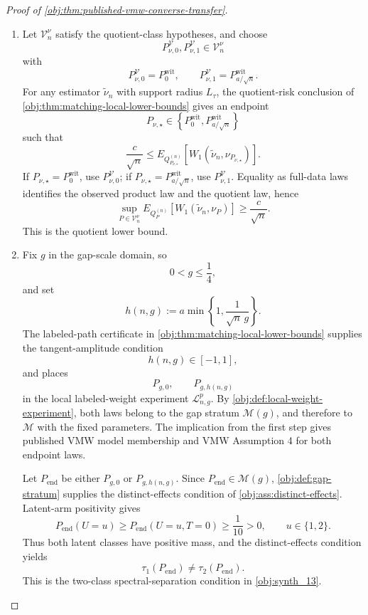 \documentclass[11pt]{article}
\begin{document}
\begin{proof}[Proof of \cref{obj:thm:published-vmw-converse-transfer}]
\begin{enumerate}
\item Let \(\mathcal V_n^\nu\) satisfy the quotient-class hypotheses, and choose
\[
P_{\nu,0}^{\mathcal V},P_{\nu,1}^{\mathcal V}\in\mathcal V_n^\nu
\]
with
\[
P_{\nu,0}^{\mathcal V}=P_0^{\mathrm{wit}},
\qquad
P_{\nu,1}^{\mathcal V}=P_{a/\sqrt n}^{\mathrm{wit}}.
\]
For any estimator \(\widetilde\nu_n\) with support radius \(L_\tau\), the quotient-risk conclusion of \cref{obj:thm:matching-local-lower-bounds} gives an endpoint
\[
P_{\nu,\star}\in
\left\{P_0^{\mathrm{wit}},P_{a/\sqrt n}^{\mathrm{wit}}\right\}
\]
such that
\[
\frac{c}{\sqrt n}
\le
E_{Q_{P_{\nu,\star}}^{(n)}}\!\left[
W_1\!\left(\widetilde\nu_n,\nu_{P_{\nu,\star}}\right)
\right].
\]
If \(P_{\nu,\star}=P_0^{\mathrm{wit}}\), use \(P_{\nu,0}^{\mathcal V}\); if
\(P_{\nu,\star}=P_{a/\sqrt n}^{\mathrm{wit}}\), use \(P_{\nu,1}^{\mathcal V}\).  Equality as full-data laws identifies the observed product law and the quotient law, hence
\[
\sup_{P\in\mathcal V_n^\nu}
E_{Q_P^{(n)}}\!\left[
W_1\!\left(\widetilde\nu_n,\nu_P\right)
\right]
\ge
\frac{c}{\sqrt n}.
\]
This is the quotient lower bound. %

\item Fix \(g\) in the gap-scale domain, so
\[
0<g\le\frac14,
\]
and set
\[
h(n,g):=
a\min\left\{1,\frac{1}{\sqrt n\,g}\right\}.
\]
The labeled-path certificate in \cref{obj:thm:matching-local-lower-bounds} supplies the tangent-amplitude condition
\[
h(n,g)\in[-1,1],
\]
and places
\[
P_{g,0},
\qquad
P_{g,h(n,g)}
\]
in the local labeled-weight experiment \(\mathcal L_{n,g}^p\).  By \cref{obj:def:local-weight-experiment}, both laws belong to the gap stratum \(\mathcal M(g)\), and therefore to \(\mathcal M\) with the fixed parameters.  The implication from the first step gives published VMW model membership and VMW Assumption 4 for both endpoint laws.

Let \(P_{\mathrm{end}}\) be either \(P_{g,0}\) or \(P_{g,h(n,g)}\).  Since \(P_{\mathrm{end}}\in\mathcal M(g)\), \cref{obj:def:gap-stratum} supplies the distinct-effects condition of \cref{obj:ass:distinct-effects}.  Latent-arm positivity gives
\[
P_{\mathrm{end}}(U=u)
\ge
P_{\mathrm{end}}(U=u,T=0)
\ge \frac1{10}>0,
\qquad u\in\{1,2\}.
\]
Thus both latent classes have positive mass, and the distinct-effects condition yields
\[
\tau_1(P_{\mathrm{end}})\ne \tau_2(P_{\mathrm{end}}).
\]
This is the two-class spectral-separation condition in \cref{obj:synth_13}. %


\end{enumerate}
\end{proof}
\end{document}

